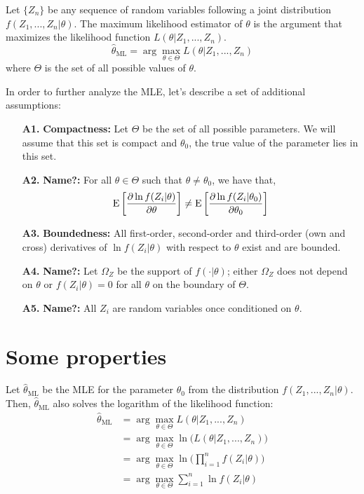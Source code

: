 \begin{definition}
Let $\{Z_n\}$ be any sequence of random variables following a joint distribution $f(Z_1, ..., Z_n\vert \theta)$. The maximum likelihood estimator of $\theta$ is the argument that maximizes the likelihood function $L(\theta\vert Z_1, ..., Z_n)$. $$\hat \theta_{\text{ML}} = \operatorname{arg}\max_{\theta \in \Theta} L(\theta\vert Z_1, ..., Z_n) $$ where $\Theta$ is the set of all possible values of $\theta$.
\end{definition}

\begin{definition}
In order to further analyze the MLE, let's describe a set of additional assumptions:
\begin{itemize}
\item[\textbf{A1.}]\textbf{Compactness:} Let $\Theta$ be the set of all possible parameters. We will assume that this set is compact and $\theta_0$, the true value of the parameter lies in this set.
\item[\textbf{A2.}]\textbf{Name?:} For all $\theta \in \Theta$ such that $\theta \neq \theta_0$, we have that,$$ \operatorname{E}\left[\frac{\partial \ln f(Z_i\vert \theta)}{\partial \theta}\right] \neq \operatorname{E}\left[\frac{\partial \ln f(Z_i\vert \theta_0)}{\partial \theta_0}\right] $$
\item[\textbf{A3.}]\textbf{Boundedness:} All first-order, second-order and third-order (own and cross) derivatives of $\ln f(Z_i\vert\theta)$ with respect to $\theta$ exist and are bounded.
\item[\textbf{A4.}]\textbf{Name?:} Let $\Omega_Z$ be the support of $f(\cdot\vert\theta)$; either $\Omega_Z$ does not depend on $\theta$ or $f(Z_i\vert \theta) = 0$ for all $\theta$ on the boundary of $\Theta$.
\item[\textbf{A5.}]\textbf{Name?:} All $Z_i$ are random variables once conditioned on $\theta$.
\end{itemize}
\end{definition}

\section{Some properties}

\begin{remark}
Let $\hat \theta_{\text{ML}}$ be the MLE for the parameter $\theta_0$ from the distribution $f(Z_1,...,Z_n\vert\theta)$. Then, $\hat \theta_{\text{ML}}$ also solves the logarithm of the likelihood function:\begin{align*}
\hat \theta_{\text{ML}} & = \operatorname{arg}\max_{\theta \in \Theta} L(\theta\vert Z_1, ..., Z_n) \\
& = \operatorname{arg}\max_{\theta \in \Theta} \ln\big(L(\theta\vert Z_1, ..., Z_n)\big) \\
& = \operatorname{arg}\max_{\theta \in \Theta} \ln\big(\prod_{i=1}^{n} f(Z_i\vert \theta)\big) \\
& = \operatorname{arg}\max_{\theta \in \Theta}\sum_{i=1}^{n} \ln f(Z_i\vert \theta) \\
\end{align*}
\end{remark}


